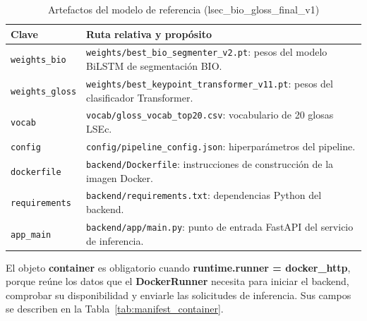 \documentclass[11pt,a4paper]{article}
\begin{document}
\begin{table}[H]
\centering
\caption{Artefactos del modelo de referencia (lsec\_bio\_gloss\_final\_v1)}
\label{tab:manifest_artifacts}
\scriptsize
\renewcommand{\arraystretch}{1.08}
\setlength{\tabcolsep}{4pt}

\begin{tabular}{
    >{\raggedright\arraybackslash}p{3.1cm}
    >{\raggedright\arraybackslash}p{9.8cm}
}
\toprule
\textbf{Clave} & \textbf{Ruta relativa y propósito} \\
\midrule
\texttt{weights\_bio} & \texttt{weights/best\_bio\_segmenter\_v2.pt}: pesos del modelo BiLSTM de segmentación BIO. \\
\texttt{weights\_gloss} & \texttt{weights/best\_keypoint\_transformer\_v11.pt}: pesos del clasificador Transformer. \\
\texttt{vocab} & \texttt{vocab/gloss\_vocab\_top20.csv}: vocabulario de 20 glosas LSEc. \\
\texttt{config} & \texttt{config/pipeline\_config.json}: hiperparámetros del pipeline. \\
\texttt{dockerfile} & \texttt{backend/Dockerfile}: instrucciones de construcción de la imagen Docker. \\
\texttt{requirements} & \texttt{backend/requirements.txt}: dependencias Python del backend. \\
\texttt{app\_main} & \texttt{backend/app/main.py}: punto de entrada FastAPI del servicio de inferencia. \\
\bottomrule
\end{tabular}
\end{table}

El objeto \textbf{container} es obligatorio cuando \textbf{runtime.runner = docker\_http}, porque reúne los datos que el \textbf{DockerRunner} necesita para iniciar el backend, comprobar su disponibilidad y enviarle las solicitudes de inferencia. Sus campos se describen en la Tabla~\ref{tab:manifest_container}.
\end{document}
